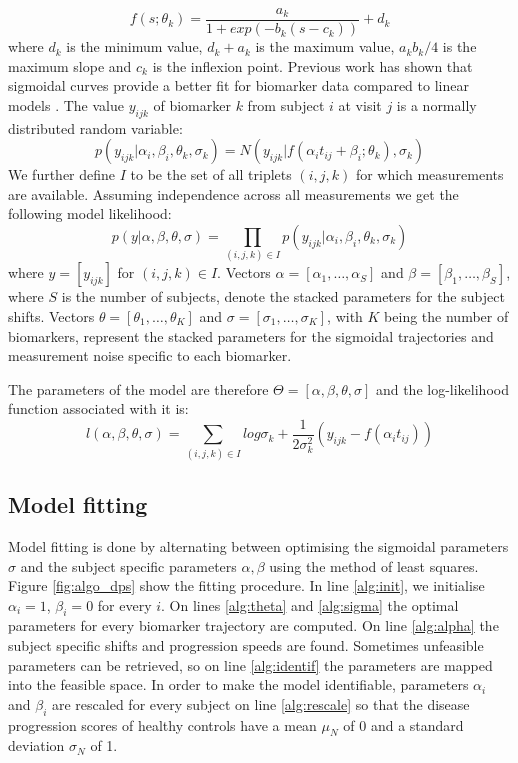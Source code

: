 \begin{equation}
 f(s;\theta_k) = \frac{a_k}{1+exp(-b_k(s-c_k))} + d_k
\end{equation}
where $d_k$ is the minimum value, $d_k+a_k$ is the maximum value, $a_kb_k/4$ is the maximum slope and $c_k$ is the inflexion point. Previous work has shown that sigmoidal curves provide a better fit for biomarker data compared to linear models \cite{sabuncu2011dynamics,caroli2010dynamics}. The value $y_{ijk}$ of biomarker $k$ from subject $i$ at visit $j$ is a normally distributed random variable:
\begin{equation}
 p(y_{ijk} | \alpha_i, \beta_i, \theta_k, \sigma_k) = N(y_{ijk} | f(\alpha_i t_{ij} + \beta_i; \theta_k), \sigma_k )
\end{equation}
We further define $I$ to be the set of all triplets $(i,j,k)$ for which measurements are available. Assuming independence across all measurements we get the following model likelihood:
\begin{equation}
 p(y | \alpha, \beta, \theta, \sigma) = \prod_{(i,j,k) \in I} p(y_{ijk} | \alpha_i, \beta_i, \theta_k, \sigma_k)
\end{equation}
where $y = [y_{ijk}]$ for $(i,j,k) \in I$. Vectors $\alpha = [\alpha_1, \dots, \alpha_S]$ and $\beta = [\beta_1, \dots, \beta_S]$, where $S$ is the number of subjects, denote the stacked parameters for the subject shifts. Vectors $\theta = [\theta_1, \dots, \theta_K]$ and $\sigma = [\sigma_1, \dots, \sigma_K]$, with $K$ being the number of biomarkers, represent the stacked parameters for the sigmoidal trajectories and measurement noise specific to each biomarker.

The parameters of the model are therefore $\Theta = [\alpha, \beta, \theta, \sigma]$ and the log-likelihood function associated with it is:
\begin{equation}
 l(\alpha, \beta, \theta, \sigma) = \sum_{(i,j,k) \in I} log \sigma_k + \frac{1}{2 \sigma_k ^2} \left( y_{ijk} - f(\alpha_i t_{ij})\right)
\end{equation}

\subsection{Model fitting}

Model fitting is done by alternating between optimising the sigmoidal parameters $\sigma$ and the subject specific parameters $\alpha, \beta$ using the method of least squares. Figure \ref{fig:algo_dps} show the fitting procedure. In line \ref{alg:init}, we initialise $\alpha_i = 1$, $\beta_i = 0$ for every $i$. On lines \ref{alg:theta} and \ref{alg:sigma} the optimal parameters for every biomarker trajectory are computed. On line \ref{alg:alpha} the subject specific shifts and progression speeds are found. Sometimes unfeasible parameters can be retrieved, so on line \ref{alg:identif} the parameters are mapped into the feasible space. In order to make the model identifiable, parameters $\alpha_i$ and $\beta_i$ are rescaled for every subject on line \ref{alg:rescale} so that the disease progression scores of healthy controls have a mean $\mu_N$ of 0 and a standard deviation $\sigma_N$ of 1.

